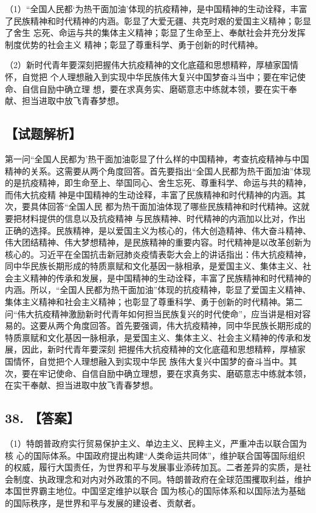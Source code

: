 \documentclass[UTF8,11pt]{ctexart}
\begin{document}
（1）“全国人民都‘为热干面加油’体现的抗疫精神，是中国精神的生动诠释，丰富了民族精神和时代精神的内涵。彰显了大爱无疆、共克时艰的爱国主义精神；彰显了舍生 忘死、命运与共的集体主义精神；彰显了生命至上、奉献社会并充分发挥制度优势的社会主义 精神；彰显了尊重科学、勇于创新的时代精神。


（2）新时代青年要深刻把握伟大抗疫精神的文化底蕴和思想精粹，厚植家国情怀，自觉把 个人理想融入到实现中华民族伟大复兴中国梦奋斗当中；要在牢记使命、自信自励中确立理 想，要在求真务实、磨砺意志中练就本领，要在实干奉献、担当进取中放飞青春梦想。


\subsection*{【试题解析】}

第一问“全国人民都为'热干面加油彰显了什么样的中国精神，考查抗疫精神与中国精神的关系。这需要从两个角度回答。首先要指出“全国人民都为热干面加油”体现的是抗疫精神，即生命至上、举国同心、舍生忘死、尊重科学、命运与共的精神，而伟大抗疫精 神是中国精神的生动诠释，丰富了民族精神和时代精神的内涵。其次，要具体回答“全国人民 都为热干面加油体现了哪些民族精神和时代精神。这就要把材料提供的信息以及抗疫精神 与民族精神、时代精神的内涵加以比对，作出正确的选择。民族精神，是以爱国主义为核心的，伟大创造精神、伟大奋斗精神、伟大团结精神、伟大梦想精神，是民族精神的重要内容。时代精神是以改革创新为核心的。习近平在全国抗击新冠肺炎疫情表彰大会上的讲话指出：伟大抗疫精神，同中华民族长期形成的特质禀赋和文化基因一脉相承，是爱国主义、集体主义、社会主义精神的传承和发展，是中国精神的生动诠释，丰富了民族精神和时代精神的内涵。所以，“全国人民都为热干面加油”体现的抗疫精神，彰显了爱国主义精神、集体主义精神和社会主义精神；也彰显了尊重科学、勇于创新的时代精神。第二问“伟大抗疫精神激励新时代青年如何担当民族复兴的时代使命”，应当讲是相对容易的。这要从两个角度回答。首先要强调，伟大抗疫精神，同中华民族长期形成的特质禀赋和文化基因一脉相承，是爱国主义、集体主义、社会主义精神的传承和发展，因此，新时代青年要深刻 把握伟大抗疫精神的文化底蕴和思想精粹，厚植家国情怀，自觉把个人理想融入到实现中华民 族伟大复兴中国梦的奋斗当中。其次，要在牢记使命、自信自励中确立理想，要在求真务实、磨砺意志中练就本领，在实干奉献、担当进取中放飞青春梦想。


\subsection*{38. 【答案】}

（1）特朗普政府实行贸易保护主义、单边主义、民粹主义，严重冲击以联合国为核 心的国际体系。中国政府提出构建“人类命运共同体”，维护联合国等国际组织的权威，履行大国责任，为世界和平与发展事业添砖加瓦。二者差异的实质，是社会制度、执政理念和对内对外政策的不同。特朗普政府在全球范围攫取利益，维护本国世界霸主地位。中国坚定维护以联合 国为核心的国际体系和以国际法为基础的国际秩序，是世界和平与发展的建设者、贡献者。
\end{document}
